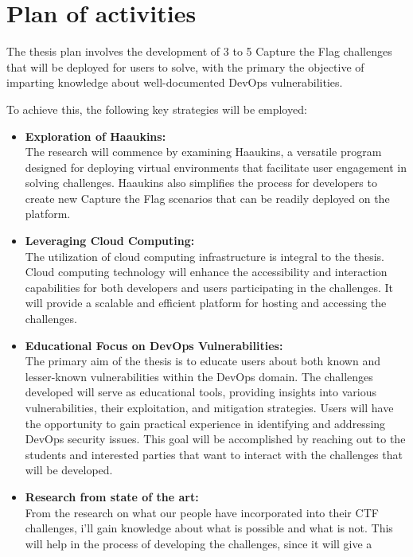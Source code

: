 \documentclass[a4, 12pt]{article}
\begin{document}
\section{Plan of activities}
The thesis plan involves the development of 3 to 5 Capture the Flag 
challenges that will be deployed for users to solve, with the primary 
the objective of imparting knowledge about well-documented DevOps vulnerabilities.

To achieve this, the following key strategies will be employed:
\begin{itemize}
    \item \textbf{Exploration of Haaukins:}\\ The research will commence by examining Haaukins, 
    a versatile program designed for deploying virtual environments that facilitate user 
    engagement in solving challenges. Haaukins also simplifies the process for developers 
    to create new Capture the Flag scenarios that can be readily deployed on the platform.\cite{haaukins_docs}\cite{haaukins_github}\cite{aau-network-security}
    \item \textbf{Leveraging Cloud Computing:}\\ The utilization of cloud computing infrastructure 
    is integral to the thesis. Cloud computing technology will enhance the accessibility 
    and interaction capabilities for both developers and users participating in the challenges. 
    It will provide a scalable and efficient platform for hosting and accessing the challenges.\cite{ucloud_cloud-computing}
    \item \textbf{Educational Focus on DevOps Vulnerabilities:}\\ The primary aim of the thesis is to 
    educate users about both known and lesser-known vulnerabilities within the DevOps domain. 
    The challenges developed will serve as educational tools, providing insights into various vulnerabilities, 
    their exploitation, and mitigation strategies. Users will have the opportunity to gain practical experience 
    in identifying and addressing DevOps security issues. This goal will be accomplished by reaching out to the students and interested parties that want to interact with the challenges that will be developed.
    \item \textbf{Research from state of the art:}\\ From the research on what our people have incorporated into their CTF challenges,
    i'll gain knowledge about what is possible and what is not. This will help in the process of developing the challenges, since it will give a 

\end{itemize}
\end{document}
